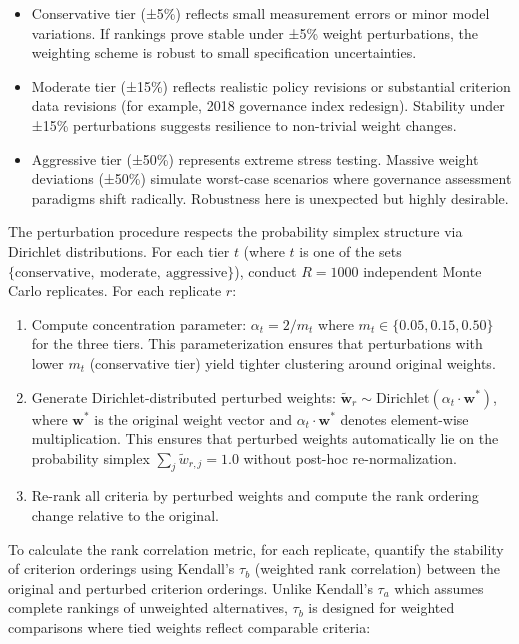 \documentclass[12pt,a4paper]{article}
\begin{document}
\begin{itemize}[itemsep=2pt]
  \item Conservative tier (±5\%) reflects small measurement errors or minor model variations. If rankings prove stable under ±5\% weight perturbations, the weighting scheme is robust to small specification uncertainties.
  
  \item Moderate tier (±15\%) reflects realistic policy revisions or substantial criterion data revisions (for example, 2018 governance index redesign). Stability under ±15\% perturbations suggests resilience to non-trivial weight changes.
  
  \item Aggressive tier (±50\%) represents extreme stress testing. Massive weight deviations (±50\%) simulate worst-case scenarios where governance assessment paradigms shift radically. Robustness here is unexpected but highly desirable.
\end{itemize}

The perturbation procedure respects the probability simplex structure via Dirichlet distributions. For each tier $t$ (where $t$ is one of the sets $\{\text{conservative},\ \text{moderate},\ \text{aggressive}\}$), conduct $R = 1000$ independent Monte Carlo replicates. For each replicate $r$:

\begin{enumerate}
  \item Compute concentration parameter: $\alpha_t = 2 / m_t$ where $m_t \in \{0.05, 0.15, 0.50\}$ for the three tiers. This parameterization ensures that perturbations with lower $m_t$ (conservative tier) yield tighter clustering around original weights.
  
  \item Generate Dirichlet-distributed perturbed weights: $\tilde{\mathbf{w}}_r \sim \text{Dirichlet}(\alpha_t \cdot \mathbf{w}^*)$, where $\mathbf{w}^*$ is the original weight vector and $\alpha_t \cdot \mathbf{w}^*$ denotes element-wise multiplication. This ensures that perturbed weights automatically lie on the probability simplex $\sum_j \tilde{w}_{r,j} = 1.0$ without post-hoc re-normalization.
  
  \item Re-rank all criteria by perturbed weights and compute the rank ordering change relative to the original.
\end{enumerate}

To calculate the rank correlation metric, for each replicate, quantify the stability of criterion orderings using Kendall's $\tau_b$ (weighted rank correlation) between the original and perturbed criterion orderings. Unlike Kendall's $\tau_a$ which assumes complete rankings of unweighted alternatives, $\tau_b$ is designed for weighted comparisons where tied weights reflect comparable criteria:
\end{document}
